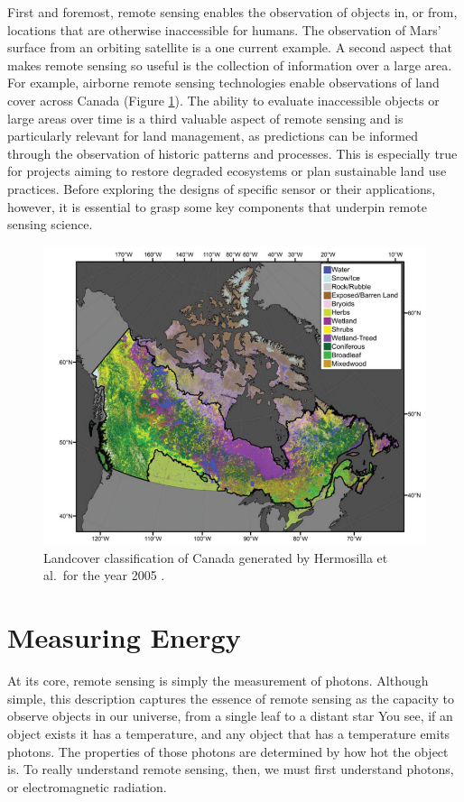 \documentclass[
]{book}
\begin{document}
First and foremost, remote sensing enables the observation of objects in, or from, locations that are otherwise inaccessible for humans. The observation of Mars' surface from an orbiting satellite is a one current example. A second aspect that makes remote sensing so useful is the collection of information over a large area. For example, airborne remote sensing technologies enable observations of land cover across Canada (Figure \ref{fig:11-hermosilla-canada-landcover}). The ability to evaluate inaccessible objects or large areas over time is a third valuable aspect of remote sensing and is particularly relevant for land management, as predictions can be informed through the observation of historic patterns and processes. This is especially true for projects aiming to restore degraded ecosystems or plan sustainable land use practices. Before exploring the designs of specific sensor or their applications, however, it is essential to grasp some key components that underpin remote sensing science.



\begin{figure}
\includegraphics[width=0.75\linewidth]{images/11-hermosilla-canada-landcover} \caption{Landcover classification of Canada generated by Hermosilla et al.~for the year 2005 \citep{hermosilla_disturbance-informed_2018}.}\label{fig:11-hermosilla-canada-landcover}
\end{figure}

\section{Measuring Energy}\label{measuring-energy}

At its core, remote sensing is simply the measurement of photons. Although simple, this description captures the essence of remote sensing as the capacity to observe objects in our universe, from a single leaf to a distant star You see, if an object exists it has a temperature, and any object that has a temperature emits photons. The properties of those photons are determined by how hot the object is. To really understand remote sensing, then, we must first understand photons, or electromagnetic radiation.
\end{document}
